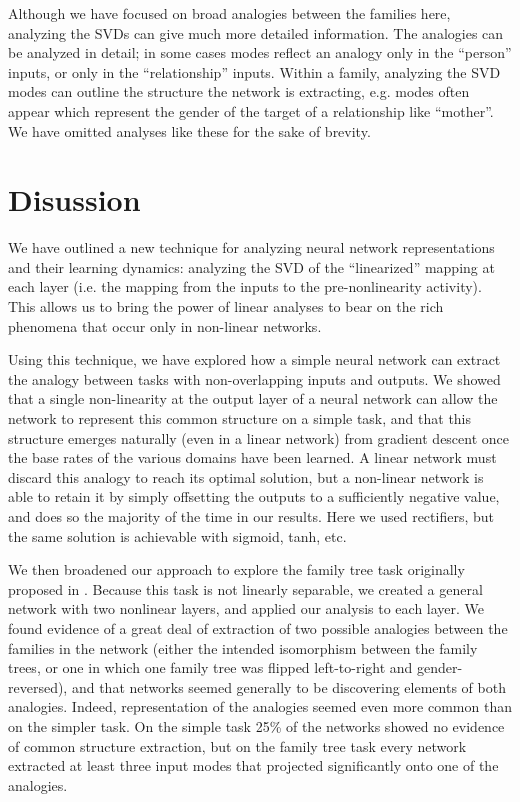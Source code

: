 \documentclass[10pt,letterpaper]{article}
\begin{document}
Although we have focused on broad analogies between the families here, analyzing the SVDs can give much more detailed information. The analogies can be analyzed in detail; in some cases modes reflect an analogy only in the ``person'' inputs, or only in the ``relationship'' inputs. Within a family, analyzing the SVD modes can outline the structure the network is extracting, e.g. modes often appear which represent the gender of the target of a relationship like ``mother''. We have omitted analyses like these for the sake of brevity. \par 
\section{Disussion}
We have outlined a new technique for analyzing neural network representations and their learning dynamics: analyzing the SVD of the ``linearized'' mapping at each layer (i.e. the mapping from the inputs to the pre-nonlinearity activity). This allows us to bring the power of linear analyses to bear on the rich phenomena that occur only in non-linear networks.\par
Using this technique, we have explored how a simple neural network can extract the analogy between tasks with non-overlapping inputs and outputs. We showed that a single non-linearity at the output layer of a neural network can allow the network to represent this common structure on a simple task, and that this structure emerges naturally (even in a linear network) from gradient descent once the base rates of the various domains have been learned. A linear network must discard this analogy to reach its optimal solution, but a non-linear network is able to retain it by simply offsetting the outputs to a sufficiently negative value, and does so the majority of the time in our results. Here we used rectifiers, but the same solution is achievable with sigmoid, tanh, etc. \par 
We then broadened our approach to explore the family tree task originally proposed in \citet{Hinton1986}. Because this task is not linearly separable, we created a general network with two nonlinear layers, and applied our analysis to each layer. We found evidence of a great deal of extraction of two possible analogies between the families in the network (either the intended isomorphism between the family trees, or one in which one family tree was flipped left-to-right and gender-reversed), and that networks seemed generally to be discovering elements of both analogies. Indeed, representation of the analogies seemed even more common than on the simpler task. On the simple task 25\% of the networks showed no evidence of common structure extraction, but on the family tree task every network extracted at least three input modes that projected significantly onto one of the analogies. \par 
\end{document}
